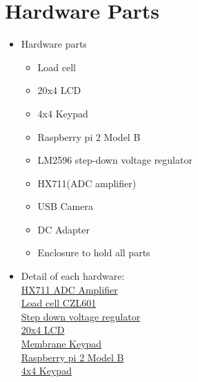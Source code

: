 \documentclass[a4paper,12pt,oneside]{book}
\begin{document}
\section{Hardware Parts}
\begin{itemize}
  \item Hardware parts
    \begin{itemize}
      \item Load cell
      \item 20x4 LCD
      \item 4x4 Keypad
      \item Raspberry pi 2 Model B
      \item LM2596 step-down voltage regulator
      \item HX711(ADC amplifier)
      \item USB Camera
      \item DC Adapter
      \item Enclosure to hold all parts
    \end{itemize}
  \item Detail of each hardware:\\
    \href{https://cdn.sparkfun.com/datasheets/Sensors/ForceFlex/hx711_english.pdf}{HX711 ADC Amplifier}\\
    \href{http://www.kadcontrols.com/KadWebsite/LoadCell_Tech/CZL601.pdf}{Load cell CZL601}\\
    \href{http://www.onsemi.com/pub_link/Collateral/LM2596-D.PDF}{Step down voltage regulator}\\
    \href{http://lispol.com/uploaded/products_files/1364491305_79923300.pdf}{20x4 LCD}\\
    \href{https://www.parallax.com/sites/default/files/downloads/27899-4x4-Matrix-Membrane-Keypad-v1.2.p    df}{Membrane Keypad}\\
     \href{https://cdn-shop.adafruit.com/pdfs/raspberrypi2modelb.pdf}{Raspberry pi 2 Model B}\\
     \href{https://www.parallax.com/sites/default/files/downloads/27899-4x4-Matrix-Membrane-Keypad-v1.2.pdf}{4x4 Keypad}\\
  
\end{itemize}
\end{document}
